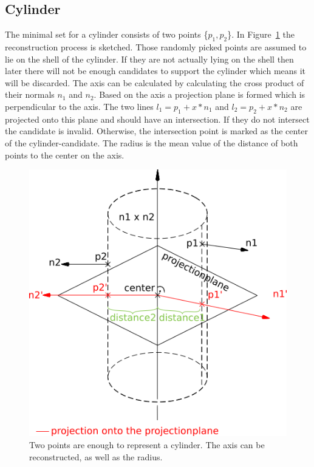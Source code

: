\documentclass[../ClassicThesis.tex]{subfiles}
\begin{document}
\subsection{Cylinder}
The minimal set for a cylinder consists of two points \{$p_1, p_2$\}. In Figure~\ref{fig:cylinder} the reconstruction process is sketched. Those randomly picked points are assumed to lie on the shell of the cylinder. If they are not actually lying on the shell then later there will not be enough candidates to support the cylinder which means it will be discarded. The axis can be calculated by calculating the cross product of their normals $n_1$ and $n_2$. Based on the axis a projection plane is formed which is perpendicular to the axis. The two lines $l_1 = p_1 + x*n_1$ and $l_2 = p_2 + x*n_2$ are projected onto this plane and should have an intersection. If they do not intersect the candidate is invalid. Otherwise, the intersection point is marked as the center of the cylinder-candidate. The radius is the mean value of the distance of both points to the center on the axis.
\begin{figure}[!ht]
    \centering
    \includegraphics[width=\columnwidth]{Images/cylinder.png}
    \caption{Two points are enough to represent a cylinder. The axis can be reconstructed, as well as the radius.}
    \label{fig:cylinder}
\end{figure}
\end{document}
